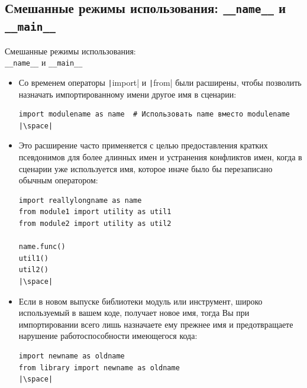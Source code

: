 \documentclass[aspectratio=169, mathserif]{beamer}	%
\begin{document}
\subsection{Смешанные режимы использования: \texttt{\_\_name\_\_} и \texttt{\_\_main\_\_}}
\begin{frame}[fragile]{Смешанные режимы использования:  \\ \texttt{\_\_name\_\_} и \texttt{\_\_main\_\_}}
\scriptsize
\begin{itemize}
	\item Со временем операторы \texttt|import| и \texttt|from| были расширены, чтобы позволить назначать импортированному имени другое имя в сценарии:
\vfill
\begin{verbatim}
import modulename as name  # Использовать name вместо modulename
|\space|
\end{verbatim}
\vfill
\item Это расширение часто применяется с целью предоставления кратких псевдонимов для более длинных имен и устранения конфликтов имен, когда в сценарии уже используется имя, которое иначе было бы перезаписано обычным оператором:
\begin{verbatim}
import reallylongname as name
from module1 import utility as util1
from module2 import utility as util2

name.func()
util1()
util2()
|\space|
\end{verbatim}
\item Если в новом выпуске библиотеки модуль или инструмент, широко используемый в вашем коде, получает новое имя, тогда Вы при импортировании всего лишь назначаете ему прежнее имя и предотвращаете нарушение работоспособности имеющегося кода:
\vfill
\begin{verbatim}
import newname as oldname
from library import newname as oldname
|\space|
\end{verbatim}
\end{itemize}
\vfill
\end{frame}


\end{document}
